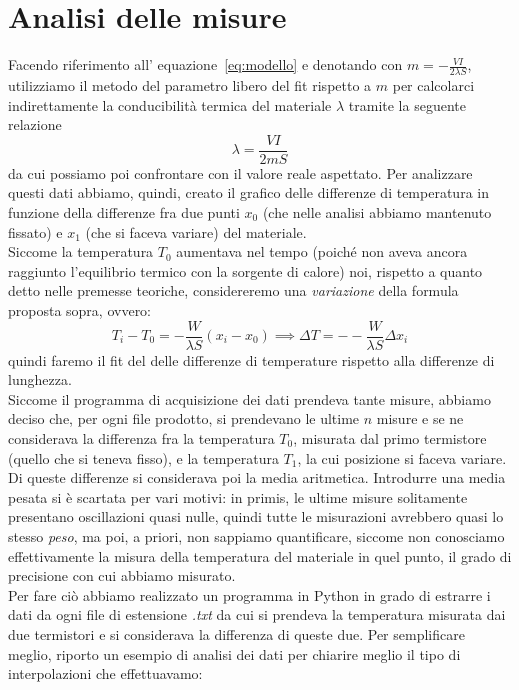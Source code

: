 \documentclass{article}
\begin{document}
\section{Analisi delle misure}
Facendo riferimento all' equazione~\ref{eq:modello} e denotando con $m = -\frac{VI}{2 \lambda S}$, utilizziamo il metodo del parametro libero del fit rispetto a $m$ per calcolarci indirettamente la conducibilità termica del materiale $\lambda$ tramite la seguente relazione
\begin{equation}
	\lambda = \frac{VI}{2mS} \label{eq:lambda}
\end{equation}
da cui possiamo poi confrontare con il valore reale aspettato.
Per analizzare questi dati abbiamo, quindi, creato il grafico delle differenze di temperatura in funzione della differenze fra due punti $x_0$ (che nelle analisi abbiamo mantenuto fissato) e $x_1$ (che si faceva variare) del materiale. \\
Siccome la temperatura $T_0$ aumentava nel tempo (poiché non aveva ancora raggiunto l'equilibrio termico con la sorgente di calore) noi, rispetto a quanto detto nelle premesse teoriche, considereremo una \emph{variazione} della formula proposta sopra, ovvero:
\begin{equation}
	T_i - T_0 = -\frac{W}{\lambda S}(x_i-x_0) \implies \Delta T = --\frac{W}{\lambda S}\Delta x_i
\end{equation}
quindi faremo il fit del delle differenze di temperature rispetto alla differenze di lunghezza. \\
Siccome il programma di acquisizione dei dati prendeva tante misure, abbiamo deciso che, per ogni file prodotto, si prendevano le ultime $n$ misure e se ne considerava la differenza fra la temperatura $T_0$, misurata dal primo termistore (quello che si teneva fisso), e la temperatura $T_1$, la cui posizione si faceva variare. Di queste differenze si considerava poi la media aritmetica. Introdurre una media pesata si è scartata per vari motivi: in primis, le ultime misure solitamente presentano oscillazioni quasi nulle, quindi tutte le misurazioni avrebbero quasi lo stesso \emph{peso}, ma poi, a priori, non sappiamo quantificare, siccome non conosciamo effettivamente la misura della temperatura del materiale in quel punto, il grado di precisione con cui abbiamo misurato. \\
Per fare ciò abbiamo realizzato un programma in Python in grado di estrarre i dati da ogni file di estensione \emph{.txt} da cui si prendeva la temperatura misurata dai due termistori e si considerava la differenza di queste due. Per semplificare meglio, riporto un esempio di analisi dei dati per chiarire meglio il tipo di interpolazioni che effettuavamo:
\end{document}
